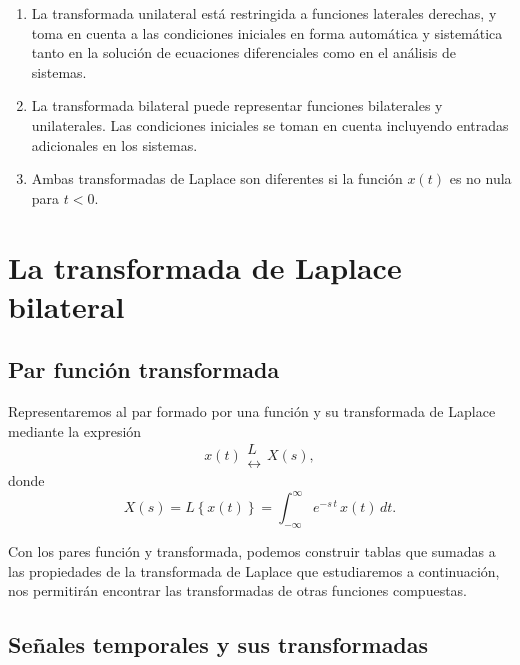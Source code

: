 \begin{enumerate}

\item  La transformada unilateral est\'{a} restringida a funciones laterales derechas, y 
toma en cuenta a las condiciones iniciales en forma autom\'{a}tica y sistem\'{a}tica tanto en la 
soluci\'{o}n de ecuaciones diferenciales como en el an\'{a}lisis de sistemas.

\item  La transformada bilateral puede representar funciones bilaterales y unilaterales. Las condiciones 
iniciales se toman en cuenta incluyendo entradas adicionales en los sistemas.

\item Ambas transformadas de Laplace son diferentes  si la funci\'{o}n $x(t)$ es no nula para $t < 0$.

\end{enumerate}

\section{La transformada de Laplace bilateral}

\subsection{Par funci\'{o}n transformada}

Representaremos al par formado por una funci\'{o}n y su transformada de Laplace mediante la expresi\'{o}n
\begin{equation}
x\left( t\right) 
\begin{array}{c}
  L \\ 
  \leftrightarrow
\end{array}
X\left( s\right),
\end{equation}
donde 
\begin{equation}
X\left( s\right) = L\left\{ x(t) \right\} = \int_{-\infty}^{\infty }e^{-s \, t} \, x(t) \, dt.
\end{equation}

Con los pares funci\'{o}n y transformada, podemos construir tablas que sumadas a las 
propiedades de la transformada de Laplace que estudiaremos a continuaci\'{o}n, 
nos permitir\'{a}n encontrar las transformadas de otras funciones compuestas.

\subsection{Se\~{n}ales temporales y sus transformadas}

